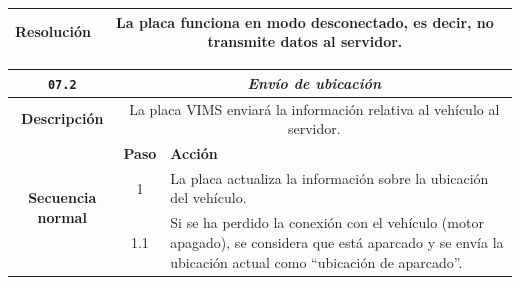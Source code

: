 \begin{table}[H]
\begin{tabularx}{\textwidth}{|c|c|X|}
    \hline\hline
    \textbf{Resolución}                         & \multicolumn{2}{X|}{La placa funciona en modo desconectado, es decir, no transmite datos al servidor.}                                                                                                                                                                                                                                                          \\
    \hline
  \end{tabularx}
\end{table}

\begin{table}[H]
  \centering
  \begin{tabularx}{\textwidth}{|c|c|X|}
    \hline
    \texttt{07.2}                               & \multicolumn{2}{c|}{\textit{Envío de ubicación}}                                                                                                                                                                                                                                                 \\
    \hline
    \textbf{Descripción}                        & \multicolumn{2}{X|}{La placa \ac{VIMS} enviará la información relativa al vehículo al servidor.}                                                                                                                                                                                                 \\
    \hline
    \multirow{18}{*}{\textbf{Secuencia normal}} & \textbf{Paso}                                                                                    & \textbf{Acción}                                                                                                                                                                               \\
    \cline{2-3}
                                                & 1                                                                                                & \multicolumn{1}{L|}{La placa actualiza la información sobre la ubicación del vehículo.}                                                                                                       \\
    \cline{2-3}
                                                & 1.1                                                                                              & \multicolumn{1}{L|}{Si se ha perdido la conexión con el vehículo (motor apagado), se considera que está aparcado y se envía la ubicación actual como ``ubicación de aparcado''.}              \\

\end{tabularx}
\end{table}

